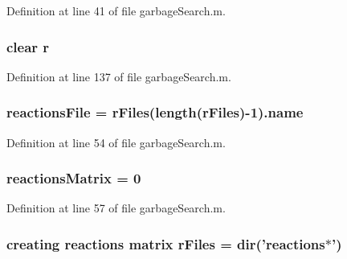 Definition at line 41 of file garbage\-Search.\-m.

\hypertarget{a00021_ac862e7284527eb913b1351c8bfb8e079}{
\subsubsection[{r}]{\setlength{\rightskip}{0pt plus 5cm}clear r}}\label{a00021_ac862e7284527eb913b1351c8bfb8e079}


Definition at line 137 of file garbage\-Search.\-m.

\hypertarget{a00021_a4c72dba1fe2ee2fbcc699262a8d0c624}{
\subsubsection[{reactions\-File}]{\setlength{\rightskip}{0pt plus 5cm}reactions\-File = {\bf r\-Files}(length({\bf r\-Files})-\/1).{\bf name}}}\label{a00021_a4c72dba1fe2ee2fbcc699262a8d0c624}


Definition at line 54 of file garbage\-Search.\-m.

\hypertarget{a00021_ac52097a2745fcef31eb175d2e9485845}{
\subsubsection[{reactions\-Matrix}]{\setlength{\rightskip}{0pt plus 5cm}reactions\-Matrix = 0}}\label{a00021_ac52097a2745fcef31eb175d2e9485845}


Definition at line 57 of file garbage\-Search.\-m.

\hypertarget{a00021_ad75735665492cabd747370126464fddf}{
\subsubsection[{r\-Files}]{\setlength{\rightskip}{0pt plus 5cm}creating {\bf reactions} matrix r\-Files = {\bf dir}('{\bf reactions}$\ast$')}}\label{a00021_ad75735665492cabd747370126464fddf}


